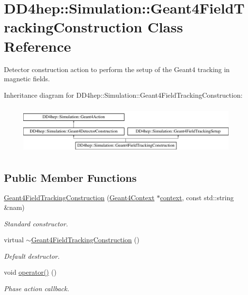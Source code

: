 \hypertarget{class_d_d4hep_1_1_simulation_1_1_geant4_field_tracking_construction}{}\section{D\+D4hep\+:\+:Simulation\+:\+:Geant4\+Field\+Tracking\+Construction Class Reference}
\label{class_d_d4hep_1_1_simulation_1_1_geant4_field_tracking_construction}


Detector construction action to perform the setup of the Geant4 tracking in magnetic fields.  


Inheritance diagram for D\+D4hep\+:\+:Simulation\+:\+:Geant4\+Field\+Tracking\+Construction\+:\begin{figure}[H]
\begin{center}
\leavevmode
\includegraphics[height=2.600619cm]{class_d_d4hep_1_1_simulation_1_1_geant4_field_tracking_construction}
\end{center}
\end{figure}
\subsection*{Public Member Functions}
\begin{DoxyCompactItemize}
\item 
\hyperlink{class_d_d4hep_1_1_simulation_1_1_geant4_field_tracking_construction_a30d46b332f2f91ec1f9923bc097812b3}{Geant4\+Field\+Tracking\+Construction} (\hyperlink{class_d_d4hep_1_1_simulation_1_1_geant4_context}{Geant4\+Context} $\ast$\hyperlink{class_d_d4hep_1_1_simulation_1_1_geant4_action_aa9d87f0ec2a72b7fc2591b18f98d75cf}{context}, const std\+::string \&nam)
\begin{DoxyCompactList}\small\item\em Standard constructor. \end{DoxyCompactList}\item 
virtual \hyperlink{class_d_d4hep_1_1_simulation_1_1_geant4_field_tracking_construction_a3c5e7faf98ffa659094ac4f18dd5d1e2}{$\sim$\+Geant4\+Field\+Tracking\+Construction} ()
\begin{DoxyCompactList}\small\item\em Default destructor. \end{DoxyCompactList}\item 
void \hyperlink{class_d_d4hep_1_1_simulation_1_1_geant4_field_tracking_construction_adcd59c071e92490f8fd37423d74f542a}{operator()} ()
\begin{DoxyCompactList}\small\item\em Phase action callback. \end{DoxyCompactList}\end{DoxyCompactItemize}
